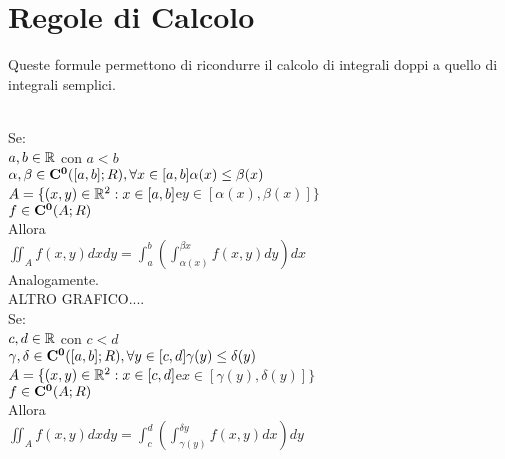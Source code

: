 \section{Regole di Calcolo}
Queste formule permettono di ricondurre il calcolo di integrali doppi a quello di integrali semplici.\\
\\
Se:\\
$a,b\in \mathbb{R}$ con $a<b$\\
$\alpha,\beta\in \mathbf{C^{0}}([a,b];R), \forall x\in[a,b] \alpha(x)\le\beta(x)$\\
$A=\{(x,y)\in \mathbb{R}^2: x\in [a,b] $e$ y\in [\alpha(x),\beta(x)] \}$\\
$f\in \mathbf{C^{0}}(A;R)$\\
Allora\\
$\iint_Af(x,y)dxdy=\int_a^b\left(\int_{\alpha(x)}^{\beta{x}}f(x,y)dy\right)dx$\\
Analogamente.\\
ALTRO GRAFICO....\\
Se:\\
$c,d\in \mathbb{R}$ con $c<d$\\
$\gamma,\delta\in \mathbf{C^{0}}([a,b];R), \forall y\in[c,d] \gamma(y)\le\delta(y)$\\
$A=\{(x,y)\in \mathbb{R}^2: x\in [c,d] $e$ x\in [\gamma(y),\delta(y)] \}$\\
$f\in \mathbf{C^{0}}(A;R)$\\
Allora\\
$\iint_Af(x,y)dxdy=\int_c^d\left(\int_{\gamma(y)}^{\delta{y}}f(x,y)dx\right)dy$
